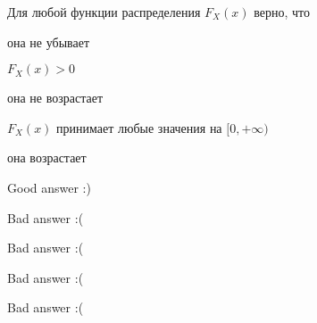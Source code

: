 
\begin{question}
Для любой функции распределения \(F_X(x)\) верно, что
\begin{answerlist}[2]
  \item она не убывает
  \item \(F_X(x) > 0\)
  \item она не возрастает
  \item \(F_{X}(x)\) принимает любые значения на \([0, +\infty)\)
  \item она возрастает
\end{answerlist}
\end{question}

\begin{solution}
\begin{answerlist}
  \item Good answer :)
  \item Bad answer :(
  \item Bad answer :(
  \item Bad answer :(
  \item Bad answer :(
\end{answerlist}
\end{solution}
